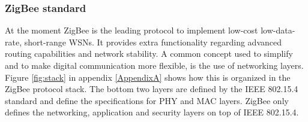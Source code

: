 \subsubsection{ZigBee standard}
\label{lab1}
At the moment ZigBee is the leading protocol to implement low-cost low-data-rate, short-range WSNs. It provides extra functionality regarding advanced routing capabilities and network stability. A common concept used to simplify and to make digital communication more flexible, is the use of networking layers. Figure \ref{fig:stack} in appendix \ref{AppendixA} shows how this is organized in the ZigBee protocol stack.  The bottom two layers are defined by the IEEE 802.15.4 standard and define the specifications for PHY and MAC layers. ZigBee only defines the networking, application and security layers on top of IEEE 802.15.4.\\
